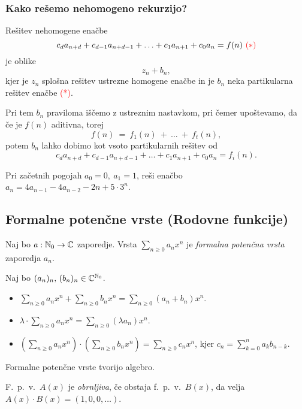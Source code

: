 \subsubsection*{Kako rešemo nehomogeno rekurzijo?}
Rešitev nehomogene enačbe 
$$c_da_{n+d} + c_{d-1}a_{n+d-1} + \ldots + c_1 a _{n+1} + c_0 a_n = f(n) \ \textcolor{red}{(*)}$$
je oblike 
$$z_n + b_n,$$
kjer je $z_n$ splošna rešitev ustrezne homogene enačbe in je $b_n$ neka partikularna rešitev enačbe \textcolor{red}{(*)}.

Pri tem $b_n$ praviloma iščemo z ustreznim nastavkom, pri čemer upoštevamo, da če je $f(n)$ aditivna, torej $$f(n)~=~f_1(n)~+~\ldots~+~f_t(n),$$ potem $b_n$ lahko dobimo kot vsoto partikularnih rešitev od $$c_da_{n+d} + c_{d-1}a_{n+d-1} + \ldots + c_1 a _{n+1} + c_0 a_n = f_i(n).$$

\begin{primer}
    Pri začetnih pogojah $a_0 = 0, \ a_1 = 1$, reši enačbo $a_n = 4a_{n-1} - 4a_{n-2} - 2n + 5 \cdot 3^n$.
\end{primer}

\subsection{Formalne potenčne vrste (Rodovne funkcije)}
\begin{definicija}
    Naj bo $a: \mathbb{N}_0 \to \mathbb{C}$ zaporedje. Vrsta $\sum_{n \geq 0}a_n x^n$ je \emph{formalna potenčna vrsta} zaporedja $a_n$.
\end{definicija}

\begin{definicija}
    Naj bo $(a_n)_n, \, (b_n)_n \in \mathbb{C}^{\mathbb{N}_0}$.
    \begin{itemize}
        \item $\sum_{n \geq 0}a_n x^n + \sum_{n \geq 0}b_n x^n = \sum_{n \geq 0}(a_n + b_n) x^n$.
        \item $\lambda \cdot \sum_{n \geq 0}a_n x^n = \sum_{n \geq 0}(\lambda a_n) x^n$.
        \item $(\sum_{n \geq 0}a_n x^n) \cdot (\sum_{n \geq 0}b_n x^n) = \sum_{n \geq 0}c_n x^n$, kjer $c_n = \sum_{k=0}^{n}a_kb_{n-k}$.
    \end{itemize}
\end{definicija}

\begin{opomba}
    Formalne potenčne vrste tvorijo algebro.
\end{opomba}

\begin{definicija}
    F.\ p.\ v.\ $A(x)$ je \emph{obrnljiva}, če obstaja f.\ p.\ v.\ $B(x)$, da velja $A(x) \cdot B(x) = (1, 0, 0, \ldots)$.
\end{definicija}

